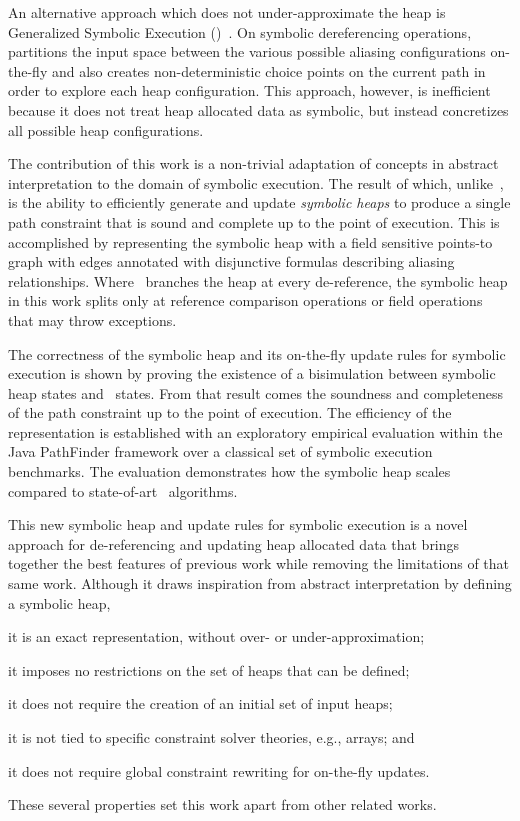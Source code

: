 An alternative approach which does not under-approximate the heap is
Generalized Symbolic Execution
(\gsetxt{})~\cite{Cadar:2008,KiasanKunit,GSE03,Rosner:2015}.  On symbolic
dereferencing operations,~\gsetxt{} partitions the input space between the
various possible aliasing configurations on-the-fly and also creates
non-deterministic choice points on the current path in order to
explore each heap configuration. This approach, however, is
inefficient because it does not treat heap allocated data as symbolic,
but instead concretizes all possible heap configurations.

The contribution of this work is a non-trivial adaptation of concepts
in abstract interpretation to the domain of symbolic execution. The
result of which, unlike~\gsetxt{}, is the ability to efficiently generate
and update \emph{symbolic heaps} to produce a single path constraint
that is sound and complete up to the point of execution. This is
accomplished by representing the symbolic heap with a field sensitive
points-to graph with edges annotated with disjunctive formulas
describing aliasing relationships. Where~\gsetxt{} branches the heap at every
de-reference, the symbolic heap in this work splits only at reference
comparison operations or field operations that may throw exceptions.

The correctness of the symbolic heap and its on-the-fly update rules
for symbolic execution is shown by proving the existence of a
bisimulation between symbolic heap states and~\gsetxt{} states. From that
result comes the soundness and completeness of the path constraint up
to the point of execution.  The efficiency of the representation is
established with an exploratory empirical evaluation within the Java
PathFinder framework over a classical set of symbolic execution
benchmarks. The evaluation demonstrates how the symbolic heap scales
compared to state-of-art~\gsetxt{} algorithms.

This new symbolic heap and update rules for symbolic execution is a
novel approach for de-referencing and updating heap allocated data
that brings together the best features of previous work while removing
the limitations of that same work. Although it draws inspiration from
abstract interpretation by defining a symbolic heap,
\begin{compactitem}
  \item it is an exact representation, without over- or under-approximation;
  \item it imposes no restrictions on the set of heaps that can be defined;
  \item it does not require the creation of an initial set of input heaps;
  \item it is not tied to specific constraint solver theories, e.g., arrays; and
  \item it does not require global constraint rewriting for on-the-fly updates.
\end{compactitem}
These several properties set this work apart from other related works.

